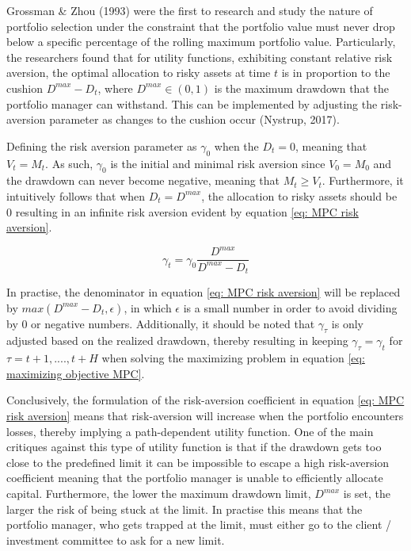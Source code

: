Grossman \& Zhou (1993) were the first to research and study the nature of portfolio selection under the constraint that the portfolio value must never drop below a specific percentage of the rolling maximum portfolio value. Particularly, the researchers found that for utility functions, exhibiting constant relative risk aversion, the optimal allocation to risky assets at time $t$ is in proportion to the cushion $D^{max}-D_t$, where $D^{max} \in (0,1)$ is the maximum drawdown that the portfolio manager can withstand. This can be implemented by adjusting the risk-aversion parameter as changes to the cushion occur (Nystrup, 2017).

Defining the risk aversion parameter as $\gamma_0$ when the $D_t = 0$, meaning that $V_t = M_t$. As such, $\gamma_0$ is the initial and minimal risk aversion since $V_0 = M_0$ and the drawdown can never become negative, meaning that $M_t \geq V_t$. Furthermore, it intuitively follows that when $D_t = D^{max}$, the allocation to risky assets should be 0 resulting in an infinite risk aversion evident by equation \ref{eq: MPC risk aversion}.

\begin{equation}
\gamma_t = \gamma_0 \frac{D^{max}}{D^{max}-D_t}
    \label{eq: MPC risk aversion}
\end{equation}

In practise, the denominator in equation \ref{eq: MPC risk aversion} will be replaced by $max(D^{max}-D_t,\epsilon)$, in which $\epsilon$ is a small number in order to avoid dividing by 0 or negative numbers. Additionally, it should be noted that $\gamma_\tau$ is only adjusted based on the realized drawdown, thereby resulting in keeping $\gamma_\tau = \gamma_t$ for $\tau = t+1,...., t+H$ when solving the maximizing problem in equation \ref{eq: maximizing objective MPC}.

Conclusively, the formulation of the risk-aversion coefficient in equation \ref{eq: MPC risk aversion} means that risk-aversion will increase when the portfolio encounters losses, thereby implying a path-dependent utility function. One of the main critiques against this type of utility function is that if the drawdown gets too close to the predefined limit it can be impossible to escape a high risk-aversion coefficient meaning that the portfolio manager is unable to efficiently allocate capital. Furthermore, the lower the maximum drawdown limit, $D^{max}$ is set, the larger the risk of being stuck at the limit. In practise this means that the portfolio manager, who gets trapped at the limit, must either go to the client / investment committee to ask for a new limit.

